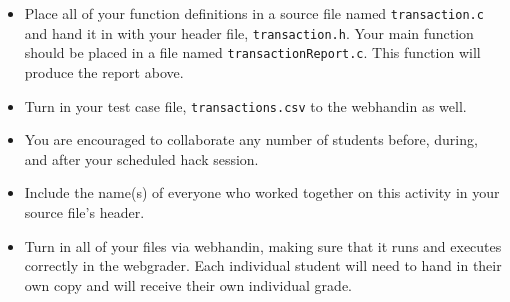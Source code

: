 \documentclass[12pt]{scrartcl}
\begin{document}
\begin{itemize}

  \item Place all of your function definitions in a source file named 
  \texttt{transaction.c} and hand it in with your header file, 
  \texttt{transaction.h}.  Your main function should be
  placed in a file named \texttt{transactionReport.c}.  This
  function will produce the report above.

  \item Turn in your test case file, \texttt{transactions.csv}
  to the webhandin as well.

  \item You are encouraged to collaborate any number of students 
  before, during, and after your scheduled hack session.  

  \item Include the name(s) of everyone who worked together on
  this activity in your source file's header.

  \item Turn in all of your files via webhandin, making sure that 
  it runs and executes correctly in the webgrader.  Each individual 
  student will need to hand in their own copy and will receive 
  their own individual grade.
\end{itemize}  
\end{document}

